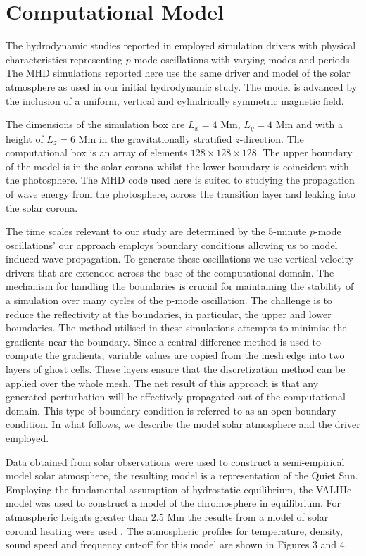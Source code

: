 \documentclass[physics,article,submit,pdftex,moreauthors]{Definitions/mdpi}
\begin{document}
\section{Computational Model}
The hydrodynamic studies reported in  \cite{Griffiths2018b} employed simulation drivers with physical characteristics representing $p$-mode oscillations with varying modes and periods. The MHD simulations reported here use the same driver and model of the solar atmosphere as used in our initial hydrodynamic study. The model is  advanced by the inclusion of a uniform, vertical and cylindrically symmetric magnetic field. 

 The dimensions of the simulation box are $L_{ x}= 4$ Mm,  $L_{y} =4$ Mm and with a height of $L_{z} =6$ Mm in the gravitationally stratified $z$-direction. The computational box is an array of elements $128 \times128 \times128 $. The upper boundary of the model is in the solar corona whilst the lower boundary is coincident with the photosphere. The MHD code used here is suited to studying the propagation of wave energy from the photosphere, across the transition layer and leaking into the solar corona. 
 
The time scales relevant to our study are determined by the 5-minute $p$-mode oscillations' our approach employs boundary conditions allowing us to model induced wave propagation. To generate these oscillations we use vertical velocity drivers  that are extended across the base of the computational domain. The mechanism for handling the boundaries is crucial for maintaining the stability of a simulation over many cycles of the p-mode oscillation. The challenge is to reduce the reflectivity at the boundaries, in particular, the upper and lower boundaries. The method utilised in these simulations attempts to minimise the gradients near the boundary. Since a central difference method is used to compute the gradients, variable values are copied from the mesh edge into two layers of ghost cells. These layers ensure that the discretization method can be applied over the whole mesh. The net result of this approach is that any generated perturbation will be effectively propagated out of the computational domain. This type of boundary condition is referred to as an open boundary condition. In what follows, we describe the model solar atmosphere and the driver employed.

Data obtained from solar observations were used to construct a semi-empirical model solar atmosphere, the resulting model is a representation of the Quiet Sun. Employing the fundamental assumption of hydrostatic equilibrium, the VALIIIc model \cite{Vernazza1981} was used to construct a model of the chromosphere in equilibrium. For atmospheric heights greater than 2.5 Mm the results from a model of solar coronal heating were used \cite{McWhirter1975}. The atmospheric profiles for temperature, density, sound speed and frequency cut-off for this model are shown in Figures 3 and 4.
\end{document}
